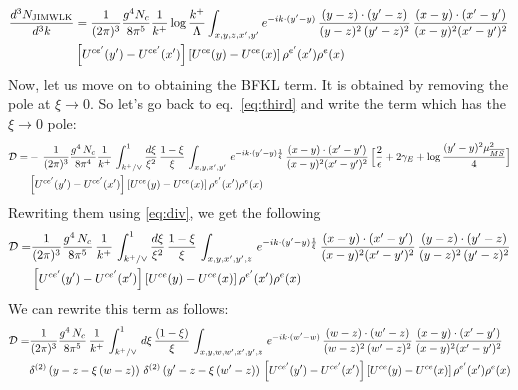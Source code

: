 \documentclass[9pt]{article}
\numberwithin{equation}{section}
\begin{document}
\begin{align}\label{eq:jzform}
    \frac{d^{3}N_{\rm JIMWLK}}{d^{3}k} & = \frac{1}{(2\pi)^{3}}\frac{g^{4}N_{c}}{8\pi^{5}}\frac{1}{k^{+}}\log\frac{k^{+}}{\Lambda}\int_{x,y,z,x',y'}e^{-ik\cdot(y'-y)}\,\frac{(y-z)\cdot (y'-z)}{(y-z)^{2}\,(y'-z)^{2}}\,\frac{(x-y)\cdot(x'-y')}{(x-y)^{2}(x'-y')^{2}}\,\notag \\ & \left[U^{ce'}(y')-U^{ce'}(x')\right]\left[U^{ce}(y)-U^{ce}(x)\right]\rho^{e'}(x')\rho^{e}(x)
\end{align}
Now, let us move on to obtaining the BFKL term. It is obtained by removing the pole at
$\xi \to 0$. So let's go back to eq.~\eqref{eq:third} and write the term which has the
$\xi \to 0$ pole:
\begin{align}
\mathcal{D} =&-\,\frac{1}{(2\pi)^{3}}\frac{g^{4}\,N_{c}}{8\pi^{4}}\frac{1}{k^{+}}\,\int_{k^{+}/\vee}^{1}\frac{d\xi}{\xi^{2}}\,\frac{1-\xi}{\xi}\,\int_{x,y,x',y'}\,e^{-ik\cdot(y'-y)\frac{1}{\xi}}\,\frac{(x-y)\cdot(x'-y')}{(x-y)^{2}(x'-y')^{2}}\, \Big[\frac{2}{\epsilon}+2\gamma_{E}+\log\frac{(y'-y)^{2}\mu^{2}_{\overline{MS}}}{4}\Big]\notag \\ & \left[U^{ce'}(y')-U^{ce'}(x')\right]\left[U^{ce}(y)-U^{ce}(x)\right]\rho^{e'}(x')\rho^{e}(x)
\end{align}
Rewriting them using \eqref{eq:div}, we get the following
\begin{align} \label{eq:second}
    \mathcal{D} = &\frac{1}{(2\pi)^{3}}\frac{g^{4}\,N_{c}}{8\pi^{5}}\,\frac{1}{k^{+}}\,\int_{k^{+}/\vee}^{1}\frac{d\xi}{\xi^{2}}\,\frac{1-\xi}{\xi}\,\int_{x,y,x',y',z}\,e^{-ik\cdot(y'-y)\frac{1}{\xi}}\,\frac{(x-y)\cdot(x'-y')}{(x-y)^{2}(x'-y')^{2}}\,\frac{(y-z)\cdot (y'-z)}{(y-z)^{2}\, (y'-z)^{2}}\notag \\ & \left[U^{ce'}(y')-U^{ce'}(x')\right]\left[U^{ce}(y)-U^{ce}(x)\right]\rho^{e'}(x')\rho^{e}(x)
\end{align}
We can rewrite this term as follows:
\begin{align}\label{eq:deltaform}
    \mathcal{D} = &\frac{1}{(2\pi)^{3}}\frac{g^{4}\,N_{c}}{8\pi^{5}}\,\frac{1}{k^{+}}\,\int_{k^{+}/\vee}^{1}\,d\xi\,\frac{(1-\xi)}{\xi}\,\int_{x,y,w,w',x',y',z}\,e^{-ik\cdot(w'-w)}\,\frac{(w-z)\cdot (w'-z)}{(w-z)^{2}\, (w'-z)^{2}}\,\frac{(x-y)\cdot(x'-y')}{(x-y)^{2}(x'-y')^{2}}\notag \\ &\delta^{(2)}\left(y-z-\xi\,(w-z)\right)\, \delta^{(2)}\left(y'-z-\xi\,(w'-z)\right)\,\left[U^{ce'}(y')-U^{ce'}(x')\right]\left[U^{ce}(y)-U^{ce}(x)\right]\rho^{e'}(x')\rho^{e}(x)
\end{align}
\end{document}
